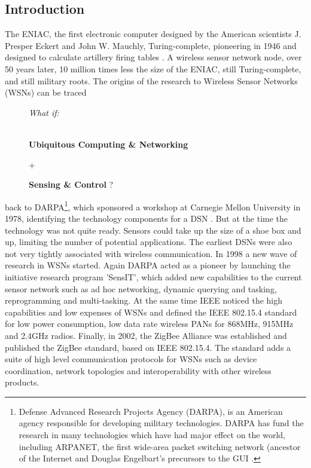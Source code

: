 \subsection{Introduction}
The ENIAC, the first electronic computer designed by the American scientists J. Presper Eckert and John W. Mauchly, Turing-complete,  pioneering in 1946 and designed to calculate artillery firing tables \citep{FLAMM}. A wireless sensor network node, over 50 years later, 10 million times less the size of the ENIAC, still Turing-complete, and still military roots. The origins of the research to Wireless Sensor Networks (WSNs) can be traced \begin{figure}
  \centering
  \parbox{4cm}{\textsl{What if: }
\begin{large}
\textbf{\\Ubiquitous Computing \& Networking} \begin{center}+\end{center} \textbf{Sensing \& Control} ?
\end{large}}
\end{figure}back to DARPA\footnote{Defense Advanced Research Projects Agency (DARPA), is an American agency responsible for developing military technologies. DARPA has fund the research in many technologies which have had major effect on the world, including ARPANET, the first wide-area packet switching network (ancestor of the Internet and Douglas Engelbart's precursors to the GUI \citep{DARWIKI}.}, which sponsored a workshop at Carnegie Mellon University in 1978, identifying the technology components for a DSN \citep{DAR}. But at the time the technology was not quite ready. Sensors could take up the size of a shoe box and up, limiting the number of potential applications. The earliest DSNs were also not very tightly associated with wireless communication. In 1998 a new wave of research in WSNs started. Again DARPA acted as a pioneer by launching the initiative research program 'SensIT', which added new capabilities to the current sensor network such as ad hoc networking, dynamic querying and tasking, reprogramming and multi-tasking. At the same time IEEE noticed the high capabilities and low expenses of WSNs and defined the IEEE 802.15.4 standard for low power consumption, low data rate wireless PANs for 868MHz, 915MHz and 2.4GHz radios. Finally, in 2002, the ZigBee Alliance was established and published the ZigBee standard, based on IEEE 802.15.4. The standard adds a suite of high level communication protocols for WSNs such as device coordination, network topologies and interoperability with other wireless products.\\
